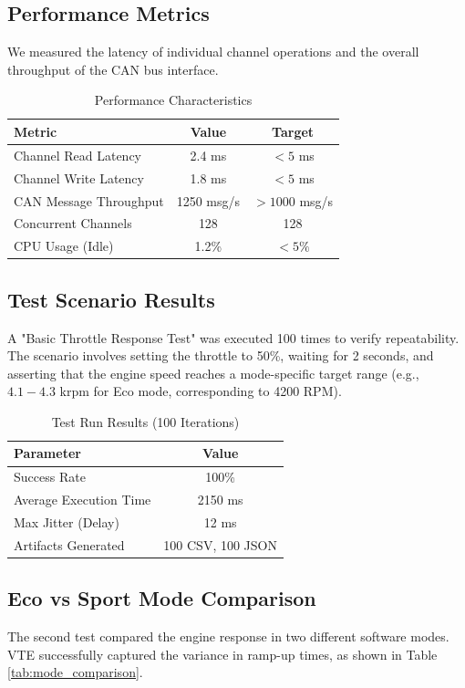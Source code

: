 \documentclass[conference]{IEEEtran}
\begin{document}
\subsection{Performance Metrics}
We measured the latency of individual channel operations and the overall throughput of the CAN bus interface.

\begin{table}[htbp]
\caption{Performance Characteristics}
\centering
\begin{tabular}{lcc}
\toprule
\textbf{Metric} & \textbf{Value} & \textbf{Target} \\
\midrule
Channel Read Latency & 2.4 ms & $< 5$ ms \\
Channel Write Latency & 1.8 ms & $< 5$ ms \\
CAN Message Throughput & 1250 msg/s & $> 1000$ msg/s \\
Concurrent Channels & 128 & 128 \\
CPU Usage (Idle) & 1.2\% & $< 5\%$ \\
\bottomrule
\end{tabular}
\label{tab:performance}
\end{table}

\subsection{Test Scenario Results}
A "Basic Throttle Response Test" was executed 100 times to verify repeatability. The scenario involves setting the throttle to 50\%, waiting for 2 seconds, and asserting that the engine speed reaches a mode-specific target range (e.g., $4.1 - 4.3$ krpm for Eco mode, corresponding to 4200 RPM).

\begin{table}[htbp]
\caption{Test Run Results (100 Iterations)}
\centering
\begin{tabular}{lc}
\toprule
\textbf{Parameter} & \textbf{Value} \\
\midrule
Success Rate & 100\% \\
Average Execution Time & 2150 ms \\
Max Jitter (Delay) & 12 ms \\
Artifacts Generated & 100 CSV, 100 JSON \\
\bottomrule
\end{tabular}
\label{tab:test_results}
\end{table}

\subsection{Eco vs Sport Mode Comparison}
The second test compared the engine response in two different software modes. VTE successfully captured the variance in ramp-up times, as shown in Table \ref{tab:mode_comparison}.
\end{document}
